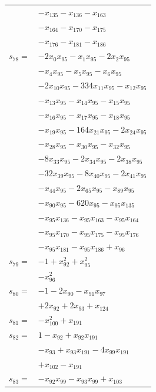 \begin{longtable}{@{}r@{\;}l@{}}
 & \(\displaystyle -x_{135} -x_{136} -x_{163}\) \\
 & \(\displaystyle -x_{164} -x_{170} -x_{175}\) \\
 & \(\displaystyle -x_{176} -x_{181} -x_{186}\) \\[3pt]
\(s_{78}=\) & \(\displaystyle -2x_{0}x_{95} -x_{1}x_{95} -2x_{2}x_{95}\) \\
 & \(\displaystyle -x_{4}x_{95} -x_{5}x_{95} -x_{6}x_{95}\) \\
 & \(\displaystyle -2x_{10}x_{95} -334x_{11}x_{95} -x_{12}x_{95}\) \\
 & \(\displaystyle -x_{13}x_{95} -x_{14}x_{95} -x_{15}x_{95}\) \\
 & \(\displaystyle -x_{16}x_{95} -x_{17}x_{95} -x_{18}x_{95}\) \\
 & \(\displaystyle -x_{19}x_{95} -164x_{21}x_{95} -2x_{24}x_{95}\) \\
 & \(\displaystyle -x_{28}x_{95} -x_{30}x_{95} -x_{32}x_{95}\) \\
 & \(\displaystyle -8x_{33}x_{95} -2x_{34}x_{95} -2x_{38}x_{95}\) \\
 & \(\displaystyle -32x_{39}x_{95} -8x_{40}x_{95} -2x_{41}x_{95}\) \\
 & \(\displaystyle -x_{44}x_{95} -2x_{65}x_{95} -x_{89}x_{95}\) \\
 & \(\displaystyle -x_{90}x_{95} -620x_{95} -x_{95}x_{135}\) \\
 & \(\displaystyle -x_{95}x_{136} -x_{95}x_{163} -x_{95}x_{164}\) \\
 & \(\displaystyle -x_{95}x_{170} -x_{95}x_{175} -x_{95}x_{176}\) \\
 & \(\displaystyle -x_{95}x_{181} -x_{95}x_{186} +x_{96}\) \\[3pt]
\(s_{79}=\) & \(\displaystyle -1 +x_{92}^{2} +x_{95}^{2}\) \\
 & \(\displaystyle -x_{96}^{2}\) \\[3pt]
\(s_{80}=\) & \(\displaystyle -1 -2x_{90} -x_{91}x_{97}\) \\
 & \(\displaystyle +2x_{92} +2x_{93} +x_{124}\) \\[3pt]
\(s_{81}=\) & \(\displaystyle -x_{100}^{2} +x_{191}\) \\[3pt]
\(s_{82}=\) & \(\displaystyle 1 -x_{92} +x_{92}x_{191}\) \\
 & \(\displaystyle -x_{93} +x_{93}x_{191} -4x_{99}x_{191}\) \\
 & \(\displaystyle +x_{102} -x_{191}\) \\[3pt]
\(s_{83}=\) & \(\displaystyle -x_{92}x_{99} -x_{93}x_{99} +x_{103}\) \\[3pt]

\end{longtable}
